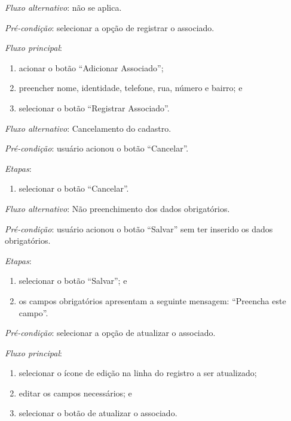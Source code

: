 \noindent \textit{Fluxo alternativo}: não se aplica.




\vspace{0.7cm}

\noindent \textit{Pré-condição}: selecionar a opção de registrar o associado.

\noindent \textit{Fluxo principal}:

\begin{enumerate}
    \item acionar o botão ``Adicionar Associado'';
    \item preencher nome, identidade, telefone, rua, número e bairro; e
    \item selecionar o botão ``Registrar Associado''.
\end{enumerate}

\noindent \textit{Fluxo alternativo}: Cancelamento do cadastro.

\noindent \textit{Pré-condição}: usuário acionou o botão ``Cancelar''.

\noindent \textit{Etapas}:

\begin{enumerate}
    \item selecionar o botão ``Cancelar''.
\end{enumerate}

\noindent \textit{Fluxo alternativo}: Não preenchimento dos dados obrigatórios.

\noindent \textit{Pré-condição}: usuário acionou o botão ``Salvar'' sem ter inserido os dados obrigatórios.

\noindent \textit{Etapas}:

\begin{enumerate}
    \item selecionar o botão ``Salvar''; e
    \item os campos obrigatórios apresentam a seguinte mensagem: ``Preencha este campo''.
\end{enumerate}




\vspace{0.7cm}

\noindent \textit{Pré-condição}: selecionar a opção de atualizar o associado.

\noindent \textit{Fluxo principal}:

\begin{enumerate}
    \item selecionar o ícone de edição na linha do registro a ser atualizado;
    \item editar os campos necessários; e
    \item selecionar o botão de atualizar o associado.
\end{enumerate}

